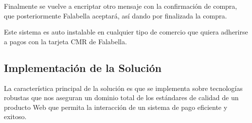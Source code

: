 \documentclass[a4paper,12pt,openany,oneside]{book}
\begin{document}
Finalmente se vuelve a encriptar otro mensaje con la confirmación de compra, que posteriormente Falabella aceptará, así dando por finalizada la compra.

Este sistema es auto instalable en cualquier tipo de comercio que quiera adherirse a pagos con la tarjeta CMR de Falabella.
\subsection{Implementación de la Solución}

La característica principal de la solución es que se implementa sobre tecnologías robustas que nos aseguran un dominio total de los estándares de calidad de un producto Web que permita la interacción de un sistema de pago eficiente y exitoso.
\end{document}
